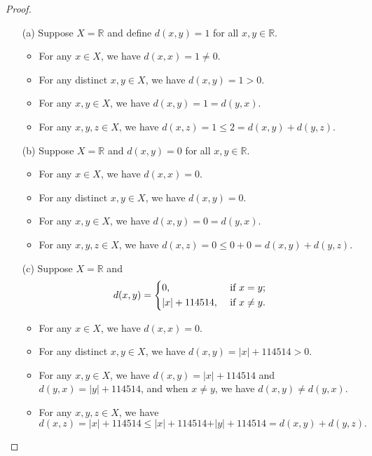 \begin{proof}
  \vphantom{text}
  \begin{itemize}
    \item [(a)] Suppose \(X=\mathbb{R} \) and define \(d(x,y)=1\) for all \(x, y \in \mathbb{R}\).
    \begin{itemize}[\(\bullet\)]
      \item For any \(x \in X\), we have \(d(x,x) = 1 \neq 0\). 
      \item For any distinct \(x, y \in X\), we have \(d(x,y) = 1 > 0\). 
      \item For any \(x, y \in X\), we have \(d(x,y) = 1 = d(y,x)\). 
      \item For any \(x, y, z \in X\), we have \(d(x,z) = 1 \le 2 = d(x,y) + d(y,z)\).        
    \end{itemize}
    \item [(b)] Suppose \(X=\mathbb{R} \) and \(d(x,y) = 0\) for all \(x,y \in \mathbb{R} \). 
    \begin{itemize}[\(\bullet\)]
      \item For any \(x \in X\), we have \(d(x,x) = 0\). 
      \item For any distinct \(x, y \in X\), we have \(d(x, y) = 0\). 
      \item For any \(x, y \in X\), we have \(d(x,y) = 0 = d(y,x)\). 
      \item For any \(x,y,z \in X\), we have \(d(x,z) = 0 \le 0 + 0 = d(x,y) + d(y,z)\).        
    \end{itemize}
    \item [(c)] Suppose \(X = \mathbb{R} \) and 
    \[
      d(x,y) = \begin{dcases}
        0 , &\text{ if } x=y ;\\
        \vert x \vert + 114514 , &\text{ if } x \neq y.
      \end{dcases}
    \] 
    \begin{itemize}[\(\bullet\)]
      \item For any \(x \in X\), we have \(d(x,x) = 0\). 
      \item For any distinct \(x,y \in X\), we have \(d(x,y) = \vert x \vert + 114514 > 0 \). 
      \item For any \(x, y \in X\), we have \(d(x,y) = \vert x \vert + 114514 \) and \(d(y,x) = \vert y \vert + 114514 \), and when \(x \neq y\), we have \(d(x,y) \neq d(y,x)\). 
      \item For any \(x, y, z \in X\), we have 
      \[
        d(x,z) = \vert x \vert + 114514 \le \vert x \vert + 114514 + \vert y \vert + 114514 = d(x,y) + d(y,z).   
\]
\end{itemize}
\end{itemize}
\end{proof}

